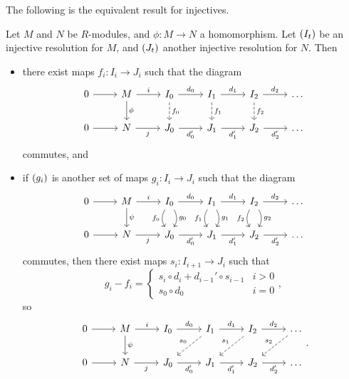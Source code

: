 The following is the equivalent result for injectives.

\begin{proposition}
Let $ M $ and $ N $ be $ R $-modules, and $ \phi : M \to N $ a homomorphism. Let $ \br{I_t} $ be an injective resolution for $ M $, and $ \br{J_t} $ another injective resolution for $ N $. Then
\begin{itemize}
\item there exist maps $ f_i : I_i \to J_i $ such that the diagram
$$
\begin{tikzcd}
0 \arrow{r} & M \arrow{r}{i} \arrow{d}{\phi} & I_0 \arrow{r}{d_0} \arrow[dashed]{d}{f_0} & I_1 \arrow{r}{d_1} \arrow[dashed]{d}{f_1} & I_2 \arrow{r}{d_2} \arrow[dashed]{d}{f_2} & \dots \\
0 \arrow{r} & N \arrow[swap]{r}{j} & J_0 \arrow[swap]{r}{d_0'} & J_1 \arrow[swap]{r}{d_1'} & J_2 \arrow[swap]{r}{d_2'} & \dots
\end{tikzcd}
$$
commutes, and
\item if $ \br{g_i} $ is another set of maps $ g_i : I_i \to J_i $ such that the diagram
$$
\begin{tikzcd}
0 \arrow{r} & M \arrow{r}{i} \arrow{d}{\psi} & I_0 \arrow{r}{d_0} \arrow[bend right=30, swap]{d}{f_0} \arrow[bend left=30]{d}{g_0} & I_1 \arrow{r}{d_1} \arrow[bend right=30, swap]{d}{f_1} \arrow[bend left=30]{d}{g_1} & I_2 \arrow{r}{d_2} \arrow[bend right=30, swap]{d}{f_2} \arrow[bend left=30]{d}{g_2} & \dots \\
0 \arrow{r} & N \arrow[swap]{r}{j} & J_0 \arrow[swap]{r}{d_0'} & J_1 \arrow[swap]{r}{d_1'} & J_2 \arrow[swap]{r}{d_2'} & \dots
\end{tikzcd}
$$
commutes, then there exist maps $ s_i : I_{i + 1} \to J_i $ such that
$$ g_i - f_i =
\begin{cases}
s_i \circ d_i + d_{i - 1}' \circ s_{i - 1} & i > 0 \\
s_0 \circ d_0 & i = 0
\end{cases},
$$
so
$$
\begin{tikzcd}
0 \arrow{r} & M \arrow{r}{i} \arrow{d}{\psi} & I_0 \arrow{r}{d_0} & I_1 \arrow{r}{d_1} \arrow[dashed, swap]{dl}{s_0} & I_2 \arrow{r}{d_2} \arrow[dashed, swap]{dl}{s_1} & \dots \arrow[dashed, swap]{dl}{s_2} \\
0 \arrow{r} & N \arrow[swap]{r}{j} & J_0 \arrow[swap]{r}{d_0'} & J_1 \arrow[swap]{r}{d_1'} & J_2 \arrow[swap]{r}{d_2'} & \dots
\end{tikzcd}.
$$
\end{itemize}
\end{proposition}

